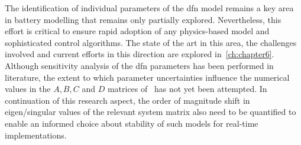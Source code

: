  The  identification of  individual parameters  of the  \gls{dfn}
model  remains a  key  area in  battery modelling  that  remains only  partially
explored. Nevertheless, this effort is critical  to ensure rapid adoption of any
physics-based model and  sophisticated control algorithms. The state  of the art
in this area, the challenges involved  and current efforts in this direction are
explored in~\cref{ch:chapter6}.  Although sensitivity analysis of  the \gls{dfn}
parameters has been performed in  literature,  the extent to
which  parameter uncertainties  influence the  numerical  values in  the $A,  B,
C$  and  $D$  matrices  of~ has  not  yet  been  attempted.
In  continuation of  this  research  aspect, the  order  of  magnitude shift  in
eigen/singular values of  the relevant system matrix also need  to be quantified
to  enable an  informed  choice about  stability of  such  models for  real-time
implementations.










